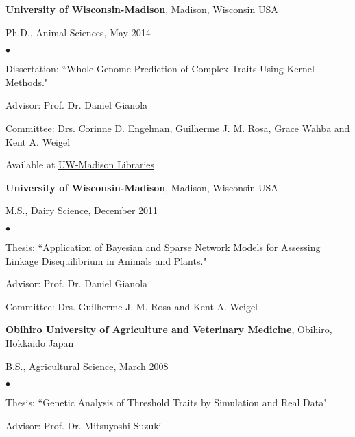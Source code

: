 \documentclass[margin,line,10pt]{res}
\newenvironment{list1}{
  \begin{list}{\ding{113}}{%
      \setlength{\itemsep}{0in}
      \setlength{\parsep}{0in} \setlength{\parskip}{0in}
      \setlength{\topsep}{0in} \setlength{\partopsep}{0in} 
      \setlength{\leftmargin}{0.17in}}}{\end{list}}
\newenvironment{list2}{
  \begin{list}{$\bullet$}{%
      \setlength{\itemsep}{0in}
      \setlength{\parsep}{0in} \setlength{\parskip}{0in}
      \setlength{\topsep}{0in} \setlength{\partopsep}{0in} 
      \setlength{\leftmargin}{0.2in}}}{\end{list}}
\begin{document}
\begin{resume}
{\bf University of Wisconsin-Madison}, Madison, Wisconsin USA\\
\vspace*{-.1in}
\begin{list1}
\item[] Ph.D., Animal Sciences, May 2014
\begin{list2}
\vspace*{.05in}
\item Dissertation: ``Whole-Genome Prediction of Complex Traits Using Kernel Methods." 
\item Advisor: Prof. Dr. Daniel Gianola 
\item Committee: Drs. Corinne D. Engelman, Guilherme J. M. Rosa, Grace Wahba and Kent A. Weigel
\item Available at  \textcolor{blue}{\href{https://search.library.wisc.edu/catalog/9910205835702121}{UW-Madison Libraries}} 
\end{list2}
\vspace*{.05in}
\end{list1}





{\bf University of Wisconsin-Madison}, Madison, Wisconsin USA\\
\vspace*{-.1in}
\begin{list1}
\item[] M.S., Dairy Science, December 2011
\begin{list2}
\vspace*{.05in}
\item Thesis: ``Application of Bayesian and Sparse Network Models for Assessing Linkage Disequilibrium in Animals and Plants." 
\item Advisor: Prof. Dr. Daniel Gianola 
\item Committee: Drs. Guilherme J. M. Rosa and Kent A. Weigel
\end{list2}
\vspace*{.05in}
\end{list1}


{\bf Obihiro University of Agriculture and Veterinary Medicine}, Obihiro, Hokkaido Japan\\
\vspace*{-.1in}
\begin{list1}
\item[] B.S., Agricultural Science,  March 2008
\begin{list2}
\vspace*{.05in}
\item Thesis:  ``Genetic Analysis of Threshold Traits by Simulation and Real Data" 
\item Advisor: Prof. Dr. Mitsuyoshi Suzuki
\end{list2}
\end{list1}





\end{resume}
\end{document}
